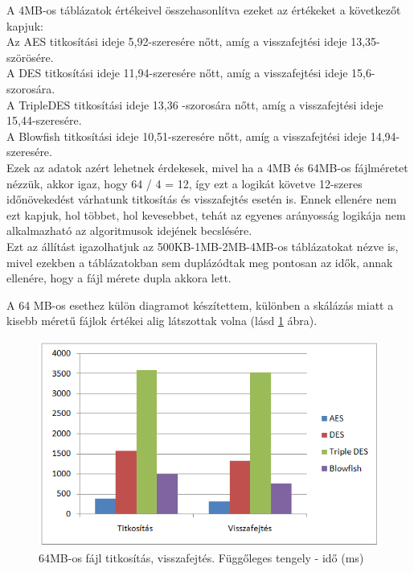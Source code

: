 \noindent A 4MB-os táblázatok értékeivel összehasonlítva ezeket az értékeket a következőt kapjuk:
\vspace{5pt}\\Az AES titkosítási ideje 5,92-szeresére nőtt, amíg a visszafejtési ideje 13,35-szörösére.
\vspace{5pt}\\A DES titkosítási ideje 11,94-szeresére nőtt, amíg a visszafejtési ideje 15,6-szorosára.
\vspace{5pt}\\A TripleDES titkosítási ideje 13,36 -szorosára nőtt, amíg a visszafejtési ideje 15,44-szeresére.
\vspace{5pt}\\A Blowfish titkosítási ideje 10,51-szeresére nőtt, amíg a visszafejtési ideje 14,94- szeresére.
\vspace{5pt}\\Ezek az adatok azért lehetnek érdekesek, mivel ha a 4MB és 64MB-os fájlméretet nézzük, akkor igaz, hogy 64 / 4 = 12, így ezt a logikát követve 12-szeres időnövekedést várhatunk titkosítás és visszafejtés esetén is. Ennek ellenére nem ezt kapjuk, hol többet, hol kevesebbet, tehát az egyenes arányosság logikája nem alkalmazható az algoritmusok idejének becslésére.
\vspace{5pt}\\Ezt az állítást igazolhatjuk az 500KB-1MB-2MB-4MB-os táblázatokat nézve is, mivel ezekben a táblázatokban sem duplázódtak meg pontosan az idők, annak ellenére, hogy a fájl mérete dupla akkora lett.



\newpage \noindent  A 64 MB-os esethez külön diagramot készítettem, különben a skálázás miatt a kisebb méretű fájlok értékei alig látszottak volna (lásd \ref{fig:alg_64mb_graf} ábra).
\begin{figure}[h]
	\centering
	\includegraphics[scale=0.8]{images/alg_graf_3.png}
	\caption{64MB-os fájl titkosítás, visszafejtés. Függőleges tengely - idő (ms)}
	\label{fig:alg_64mb_graf}
\end{figure}

